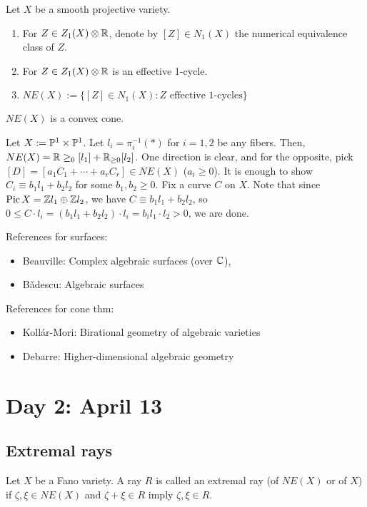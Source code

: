\documentclass{../../small}
\DeclareMathOperator{\Pic}{Pic}
\begin{document}
\begin{defn}
Let $X$ be a smooth projective variety.
\begin{enumerate}
	\item For $Z\in Z_1(X)\otimes\R$, denote by $[Z]\in N_1(X)$ the numerical equivalence class of $Z$.
	\item For $Z\in Z_1(X)\otimes\R$ is an effective 1-cycle.
	\item $NE(X):=\{[Z]\in N_1(X): Z\text{ effective 1-cycles}\}$
\end{enumerate}
\end{defn}
\begin{rmk}
$NE(X)$ is a convex cone.
\end{rmk}

\begin{ex}
Let $X:=\P^1\times\P^1$.
Let $l_i=\pi_i^{-1}(*)$ for $i=1,2$ be any fibers.
Then, $NE(X)=\R\ge_0[l_1]+\R_{\ge0}[l_2]$.
One direction is clear, and for the opposite, pick $[D]=[a_1C_1+\cdots+a_rC_r]\in NE(X)$ ($a_i\ge0$).
It is enough to show $C_i\equiv b_1l_1+b_2l_2$ for some $b_1,b_2\ge0$.
Fix a curve $C$ on $X$.
Note that since $\Pic X=\Z l_1\oplus\Z l_2$, we have $C\equiv b_1l_1+b_2l_2$, so $0\le C\cdot l_i=(b_1l_1+b_2l_2)\cdot l_i=b_il_1\cdot l_2>0$, we are done.
\end{ex}

References for surfaces:
\begin{itemize}
\item Beauville: Complex algebraic surfaces (over $\C$), 
\item B\v adescu: Algebraic surfaces
\end{itemize}

References for cone thm:
\begin{itemize}
\item Koll\'ar-Mori: Birational geometry of algebraic varieties 
\item Debarre: Higher-dimensional algebraic geometry
\end{itemize}


\section{Day 2: April 13}

\subsection*{Extremal rays}

\begin{defn}
Let $X$ be a Fano variety.
A ray $R$ is called an extremal ray (of $NE(X)$ or of $X$) if $\zeta,\xi\in NE(X)$ and $\zeta+\xi\in R$ imply $\zeta,\xi\in R$.
\end{defn}
\end{document}
